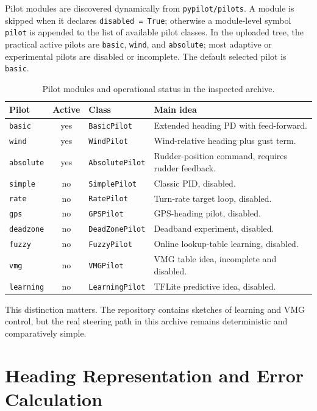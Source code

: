 \documentclass[10pt,twocolumn]{article}
\begin{document}
Pilot modules are discovered dynamically from \texttt{pypilot/pilots}.  A module is
skipped when it declares \texttt{disabled = True}; otherwise a module-level symbol
\texttt{pilot} is appended to the list of available pilot classes.  In the uploaded tree,
the practical active pilots are \texttt{basic}, \texttt{wind}, and \texttt{absolute}; most
adaptive or experimental pilots are disabled or incomplete.  The default selected pilot
is \texttt{basic}.

\begin{table}[!tbp]
\centering
\caption{Pilot modules and operational status in the inspected archive.}
\label{tab:pilots}
\begin{tabularx}{\columnwidth}{@{}Z{0.19\columnwidth}cZ{0.24\columnwidth}Y@{}}
\toprule
Pilot & Active & Class & Main idea \\
\midrule
\texttt{basic} & yes & \texttt{BasicPilot} & Extended heading PD with feed-forward. \\
\texttt{wind} & yes & \texttt{WindPilot} & Wind-relative heading plus gust term. \\
\texttt{absolute} & yes & \texttt{AbsolutePilot} & Rudder-position command, requires rudder feedback. \\
\texttt{simple} & no & \texttt{SimplePilot} & Classic PID, disabled. \\
\texttt{rate} & no & \texttt{RatePilot} & Turn-rate target loop, disabled. \\
\texttt{gps} & no & \texttt{GPSPilot} & GPS-heading pilot, disabled. \\
\texttt{deadzone} & no & \texttt{DeadZonePilot} & Deadband experiment, disabled. \\
\texttt{fuzzy} & no & \texttt{FuzzyPilot} & Online lookup-table learning, disabled. \\
\texttt{vmg} & no & \texttt{VMGPilot} & VMG table idea, incomplete and disabled. \\
\texttt{learning} & no & \texttt{LearningPilot} & TFLite predictive idea, disabled. \\
\bottomrule
\end{tabularx}
\end{table}

This distinction matters.  The repository contains sketches of learning and VMG control,
but the real steering path in this archive remains deterministic and comparatively simple.

\section{Heading Representation and Error Calculation}
\end{document}

